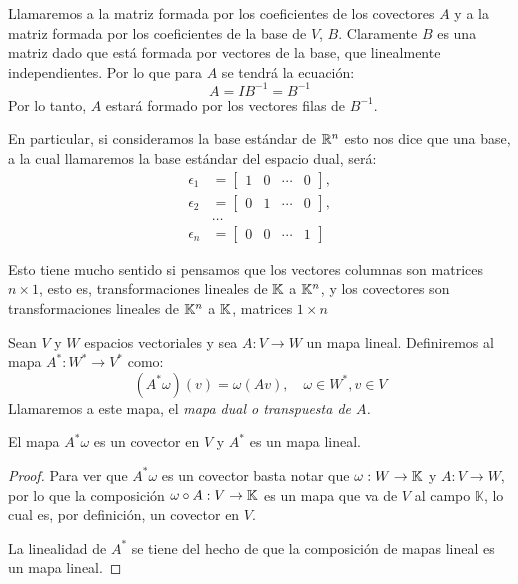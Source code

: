\begin{example}
  Llamaremos a la matriz formada por los coeficientes de los covectores $A$ y a la matriz formada por los coeficientes de la base de $V$, $B$. Claramente $B$ es una matriz dado que está formada por vectores de la base, que linealmente independientes. Por lo que para $A$ se tendrá la ecuación:
  \[
    A = IB^{-1} = B^{-1}
  \]
  Por lo tanto, $A$ estará formado por los vectores filas de $B^{-1}$.

  En particular, si consideramos la base estándar de $\mathbb{R}^n$ esto nos dice que una base, a la cual llamaremos la base estándar del espacio dual, será:
\begin{align*}
  \epsilon_1 &= \begin{bmatrix} 1 & 0 & \cdots & 0\end{bmatrix},\\
  \epsilon_2 &= \begin{bmatrix} 0 & 1 & \cdots & 0\end{bmatrix},\\
             &\hdots \\
  \epsilon_n &= \begin{bmatrix} 0 & 0 & \cdots & 1\end{bmatrix}
\end{align*}

Esto tiene mucho sentido si pensamos que los vectores columnas son matrices $n \times 1$, esto es, transformaciones lineales de $\mathbb{K}$ a $\mathbb{K}^n$, y los covectores son transformaciones lineales de $\mathbb{K}^n$ a $\mathbb{K}$, matrices $1 \times n$
\end{example}

\begin{definition}
  Sean $V$ y $W$ espacios vectoriales y sea $A: V \to W$ un mapa lineal. Definiremos al mapa $A^*: W^* \to V^*$ como:
  \[
    (A^{*}\omega)(v) = \omega(Av), \quad \omega \in W^{*}, v \in V
  \]  
  Llamaremos a este mapa, el \it{mapa dual} o \it{transpuesta de $A$}.
\end{definition}

\begin{lemma}
  El mapa $A^{*}\omega$ es un covector en $V$ y $A^{*}$ es un mapa lineal.
\end{lemma}

\begin{proof}
  Para ver que $A^{*}\omega$ es un covector basta notar que $\omega: W \to \mathbb{K}$ y $A: V \to W$, por lo que la composición $\omega \circ A: V \to \mathbb{K}$ es un mapa que va de $V$ al campo $\mathbb{K}$, lo cual es, por definición, un covector en $V$.

  La linealidad de $A^{*}$ se tiene del hecho de que la composición de mapas lineal es un mapa lineal.
\end{proof}

